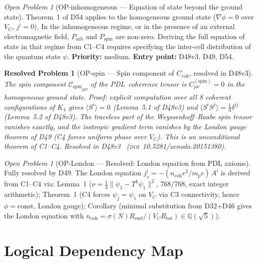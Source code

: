 \documentclass[11pt,a4paper]{article}
\newtheorem{resolvedproblem}{Resolved Problem}
\newcommand{\Cspin}{{\mathcal{C}_{\mathrm{spin}}}}
\theoremstyle{plain}
\theoremstyle{definition}
\theoremstyle{remark}
\newtheorem{openproblem}[theorem]{Open Problem}
\newcommand{\PDL}{\textnormal{PDL}}
\newcommand{\Rsurf}{R_{\mathrm{surf}}}
\newcommand{\Rtot}{R_{\mathrm{tot}}}
\newcommand{\Ccoh}{C_{\mathrm{coh}}}
\begin{document}
\begin{openproblem}[OP-inhomogeneous --- Equation of state beyond the ground state]
\label{op:inhomogeneous}
Theorem~1 of D54 applies to the homogeneous ground state ($\nabla\phi = 0$ over $V_C$, $j^i = 0$). In the inhomogeneous regime, or in the presence of an external electromagnetic field, $P_{\mathrm{orb}}$ and $P_{\mathrm{spin}}$ are non-zero. Deriving the full equation of state in that regime from C1--C4 requires specifying the inter-cell distribution of the quantum state $\psi$. \textbf{Priority:} medium. \textbf{Entry point:} D48v3, D49, D54.
\end{openproblem}

\begin{resolvedproblem}[OP-spin --- Spin component of $\Ccoh$, resolved in D48v3]
\label{op:spin}
The spin component $\Cspin_{\mu\nu}$ of the \PDL\ coherence tensor is $C^{(\mathrm{spin})}_{\mu\nu} = 0$ in the homogeneous ground state. Proof: explicit computation over all 8 coherent configurations of $K_4$ gives $\langle S^i\rangle = 0$ (Lemma~5.1 of D48v3) and $\langle S^i S^j\rangle = \tfrac{1}{4}\delta^{ij}$ (Lemma~5.2 of D48v3). The traceless part of the Weyssenhoff--Raabe spin tensor vanishes exactly, and the isotropic gradient term vanishes by the London gauge theorem of D49 (C4 forces uniform phase over $V_C$). This is an unconditional theorem of C1--C4. Resolved in D48v3~\cite{D48} (\textsc{doi}~10.5281/zenodo.20151380).
\end{resolvedproblem}

\begin{openproblem}[OP-London --- Resolved: London equation from PDL axioms]
\label{op:London}
\textcolor{proofblue}{Fully resolved by D49.} The London equation $j^i_s = -(n_{\mathrm{coh}} e^2/m_p c)\,A^i$ is derived from C1--C4 via: Lemma~1 ($\nu = \tfrac{1}{4}\|\psi_1 - T^k\psi_1\|^2$, 768/768, exact integer arithmetic); Theorem~1 (C4 forces $\psi_j = \psi_1$ on $V_C$ via C3 connectivity, hence $\phi = \mathrm{const}$, London gauge); Corollary (minimal substitution from D32+D46 gives the London equation with $n_{\mathrm{coh}} = \sigma(N)\Rsurf/(V_C\Rtot) \in \mathbb{Q}(\sqrt{5})$).
\end{openproblem}

\clearpage

\section{Logical Dependency Map}
\end{document}
